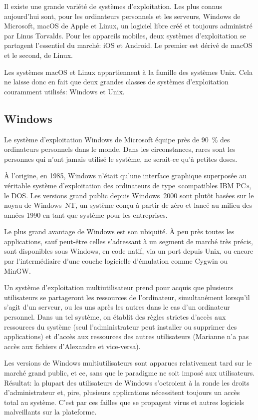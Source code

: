 Il existe une grande variété de systèmes d'exploitation. Les plus
connus aujourd'hui sont, pour les ordinateurs personnels et les
serveurs, Windows de Microsoft, macOS de Apple et Linux, un logiciel
libre créé et toujours administré par Linus Torvalds. Pour les
appareils mobiles, deux systèmes d'exploitation se partagent
l'essentiel du marché: iOS et Android. Le premier est dérivé de macOS
et le second, de Linux.

Les systèmes macOS et Linux appartiennent à la famille des systèmes
Unix. Cela ne laisse donc en fait que deux grandes classes de systèmes
d'exploitation couramment utilisés: Windows et Unix.

\subsection{Windows}
\label{sec:informatique:os:windows}

Le système d'exploitation Windows de Microsoft équipe
près de 90~\% des ordinateurs personnels dans le monde. Dans les
circonstances, rares sont les personnes qui n'ont jamais utilisé le
système, ne serait-ce qu'à petites doses.

À l'origine, en 1985, Windows n'était qu'une interface graphique
superposée au véritable système d'exploitation des ordinateurs de type
«compatibles IBM PC», le DOS. Les versions grand public depuis
Windows~2000 sont plutôt basées sur le noyau de Windows~NT, un système
conçu à partir de zéro et lancé au milieu des années 1990 en tant que
système pour les entreprises.

Le plus grand avantage de Windows est son ubiquité. À peu près toutes
les applications, sauf peut-être celles s'adressant à un segment de
marché très précis, sont disponibles sous Windows, en code natif, via
un port depuis Unix, ou encore par l'intermédiaire d'une couche
logicielle d'émulation comme Cygwin ou MinGW.

Un système d'exploitation multiutilisateur prend pour acquis que
plusieurs utilisateurs se partageront les ressources de l'ordinateur,
simultanément lorsqu'il s'agit d'un serveur, ou les uns après les
autres dans le cas d'un ordinateur personnel. Dans un tel système, on
établit des règles strictes d'accès aux ressources du système (seul
l'administrateur peut installer ou supprimer des applications) et
d'accès aux ressources des autres utilisateurs (Marianne n'a pas
accès aux fichiers d'Alexandre et vice-versa).

Les versions de Windows multiutilisateurs sont apparues relativement
tard sur le marché grand public, et ce, sans que le paradigme ne soit
imposé aux utilisateurs. Résultat: la plupart des utilisateurs de
Windows s'octroient à la ronde les droits d'administrateur et, pire,
plusieurs applications nécessitent toujours un accès total au système.
C'est par ces failles que se propagent virus et autres logiciels
malveillants sur la plateforme.

